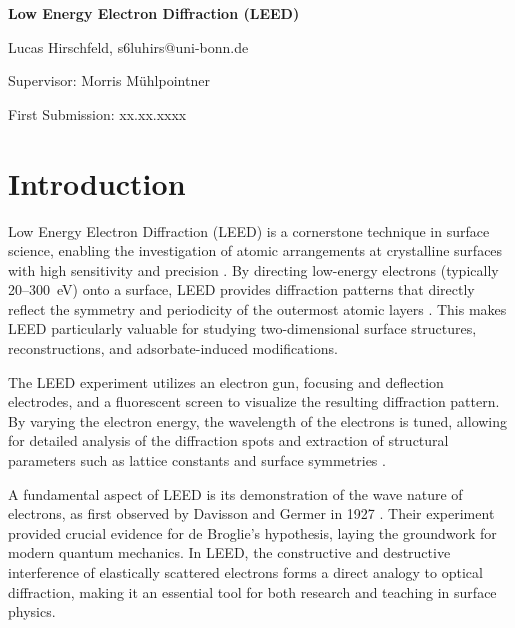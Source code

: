 \documentclass[fontsize=11pt,reqno,a4paper,oneside]{scrartcl}
\makeatletter
\def\Autor{Lucas Hirschfeld, s6luhirs@uni-bonn.de}
\def\Titel{Low Energy Electron Diffraction (LEED)}
\def\Date{First Submission: xx.xx.xxxx}
\def\PiC{Supervisor: Morris Mühlpointner}
\def\Abstract{ }
\makeatother
\begin{document}
\pagestyle{empty}
\begin{titlepage}
    \begin{center}
        \vspace*{\fill}
        {\LARGE\bfseries \Titel}\par\vspace{2cm}
        {\Autor\par\vspace{0.5cm}\PiC\par\vspace{1cm}\par\vspace{0.2cm}\Date\par\vspace{5cm}}
    
    \end{center}
        {\Abstract\vspace{0.5cm}\par}\vfill
\end{titlepage}


\pagestyle{scrheadings}
\ihead{\headmark}
\ofoot{\pagemark}
\tableofcontents
{}
\clearpage

\newpage
\section{Introduction}

Low Energy Electron Diffraction (LEED) is a cornerstone technique in surface science, enabling the investigation of atomic arrangements at crystalline surfaces with high sensitivity and precision \cite{vanHove1986, Henzler1994}. By directing low-energy electrons (typically 20--300~eV) onto a surface, LEED provides diffraction patterns that directly reflect the symmetry and periodicity of the outermost atomic layers \cite{Pendry1974}. This makes LEED particularly valuable for studying two-dimensional surface structures, reconstructions, and adsorbate-induced modifications.

The LEED experiment utilizes an electron gun, focusing and deflection electrodes, and a fluorescent screen to visualize the resulting diffraction pattern. By varying the electron energy, the wavelength of the electrons is tuned, allowing for detailed analysis of the diffraction spots and extraction of structural parameters such as lattice constants and surface symmetries \cite{Oura2013}.

A fundamental aspect of LEED is its demonstration of the wave nature of electrons, as first observed by Davisson and Germer in 1927 \cite{Davisson1927}. Their experiment provided crucial evidence for de Broglie's hypothesis, laying the groundwork for modern quantum mechanics. In LEED, the constructive and destructive interference of elastically scattered electrons forms a direct analogy to optical diffraction, making it an essential tool for both research and teaching in surface physics.
\end{document}

